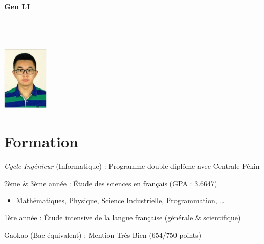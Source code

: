 \documentclass{resume}
\begin{document}

\noindent\begin{minipage}{0.375\textwidth}
  {\Large \textbf{Gen LI}} \\
     \\
   \\
   \\
\end{minipage}
\hfill%
\begin{minipage}{0.6\textwidth}\raggedleft
  \includegraphics[width=0.88in]{avatar}
\end{minipage}

\section{Formation}
\textit{Cycle Ingénieur} (Informatique) : Programme double diplôme avec Centrale Pékin

2ème \& 3ème année : Étude des sciences en français (GPA : 3.6647)
\begin{itemize}
  \item Mathématiques, Physique, Science Industrielle, Programmation, …
\end{itemize}
1ère année : Étude intensive de la langue française (générale \& scientifique)

Gaokao (Bac équivalent) : Mention Très Bien (654/750 points)
\end{document}

